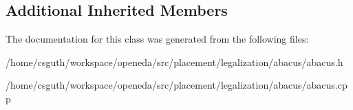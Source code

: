 \subsection*{Additional Inherited Members}


The documentation for this class was generated from the following files\-:\begin{DoxyCompactItemize}
\item 
/home/csguth/workspace/openeda/src/placement/legalization/abacus/abacus.\-h\item 
/home/csguth/workspace/openeda/src/placement/legalization/abacus/abacus.\-cpp\end{DoxyCompactItemize}
